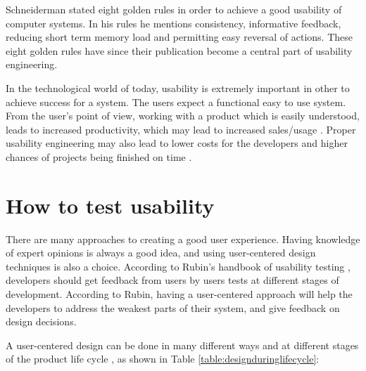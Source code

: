 Schneiderman stated eight golden rules in order to achieve a good usability of computer systems\cite{shneiderman2003designing}. In his rules he mentions consistency, informative feedback, reducing short term memory load and permitting easy reversal of actions. These eight golden rules have since their publication become a central part of usability engineering.

In the technological world of today, usability is extremely important in other to achieve success for a system. The users expect a functional easy to use system. From the user's point of view, working with a product which is easily understood, leads to increased productivity, which may lead to increased sales/usage \cite{folmer2004architecting}. Proper usability engineering may also lead to lower costs for the developers and higher chances of projects being finished on time \cite{nielsen1994usability}. 


\section{How to test usability}
\label{sec:howtotestusability}
There are many approaches to creating a good user experience. Having knowledge of expert opinions is always a good idea, and using user-centered design techniques is also a choice. According to Rubin's handbook of usability testing \cite{rubin2008handbook}, developers should get feedback from users by users tests at different stages of development. According to Rubin, having a user-centered approach will help the developers to address the weakest parts of their system, and give feedback on design decisions. 

A user-centered design can be done in many different ways and at different stages of the product life cycle \cite{abrasusercentereddesign}, as shown in Table \ref{table:designduringlifecycle}:

